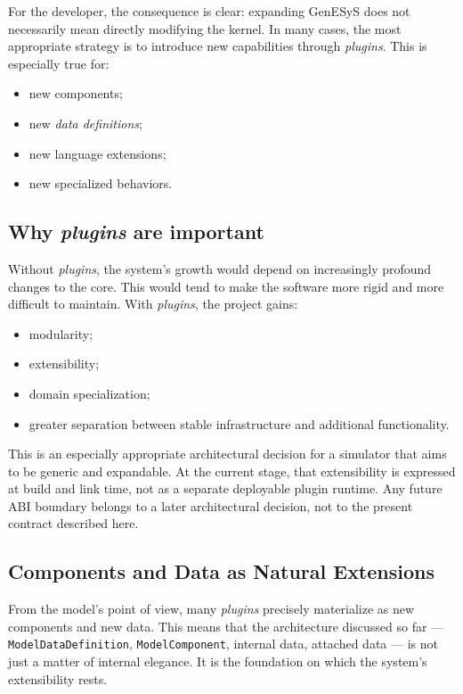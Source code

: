 For the developer, the consequence is clear: expanding GenESyS does not necessarily mean directly modifying the kernel. In many cases, the most appropriate strategy is to introduce new capabilities through \textit{plugins}. This is especially true for:
\begin{itemize}
 \item new components;
 \item new \textit{data definitions};
 \item new language extensions;
 \item new specialized behaviors.
\end{itemize}

\subsection{Why \textit{plugins} are important}
\label{subsec:cap8_por_que_plugins_importantes}

Without \textit{plugins}, the system's growth would depend on increasingly profound changes to the core. This would tend to make the software more rigid and more difficult to maintain. With \textit{plugins}, the project gains:
\begin{itemize}
 \item modularity;
 \item extensibility;
 \item domain specialization;
 \item greater separation between stable infrastructure and additional functionality.
\end{itemize}

This is an especially appropriate architectural decision for a simulator that aims to be generic and expandable. At the current stage, that extensibility is expressed at build and link time, not as a separate deployable plugin runtime. Any future ABI boundary belongs to a later architectural decision, not to the present contract described here.

\subsection{Components and Data as Natural Extensions}
\label{subsec:cap8_componentes_dados_extensoes_naturais}

From the model's point of view, many \textit{plugins} precisely materialize as new components and new data. This means that the architecture discussed so far — \texttt{ModelDataDefinition}, \texttt{ModelComponent}, internal data, attached data — is not just a matter of internal elegance. It is the foundation on which the system's extensibility rests.

